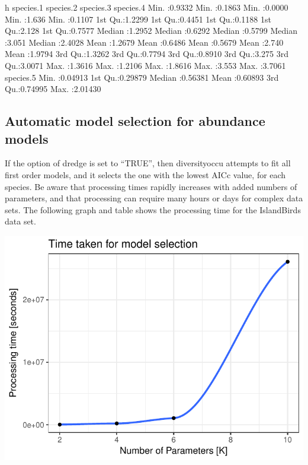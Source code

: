 \documentclass[article]{jss}
\begin{document}
\begin{CodeChunk}


\begin{CodeOutput}
       h            species.1        species.2        species.3       species.4     
 Min.   :0.9332   Min.   :0.1863   Min.   :0.0000   Min.   :1.636   Min.   :0.1107  
 1st Qu.:1.2299   1st Qu.:0.4451   1st Qu.:0.1188   1st Qu.:2.128   1st Qu.:0.7577  
 Median :1.2952   Median :0.6292   Median :0.5799   Median :3.051   Median :2.4028  
 Mean   :1.2679   Mean   :0.6486   Mean   :0.5679   Mean   :2.740   Mean   :1.9794  
 3rd Qu.:1.3262   3rd Qu.:0.7794   3rd Qu.:0.8910   3rd Qu.:3.275   3rd Qu.:3.0071  
 Max.   :1.3616   Max.   :1.2106   Max.   :1.8616   Max.   :3.553   Max.   :3.7061  
   species.5      
 Min.   :0.04913  
 1st Qu.:0.29879  
 Median :0.56381  
 Mean   :0.60893  
 3rd Qu.:0.74995  
 Max.   :2.01430  
\end{CodeOutput}
\end{CodeChunk}

\subsection{Automatic model selection for abundance
models}\label{automatic-model-selection-for-abundance-models}

If the option of dredge is set to ``TRUE'', then diversityoccu attempts
to fit all first order models, and it selects the one with the lowest
AICc value, for each species. Be aware that processing times rapidly
increases with added numbers of parameters, and that processing can
require many hours or days for complex data sets. The following graph
and table shows the processing time for the IslandBirds data set.

\begin{CodeChunk}


\begin{center}\includegraphics{diversityocc_files/figure-latex/unnamed-chunk-19-1} \end{center}

\end{CodeChunk}
\end{document}
